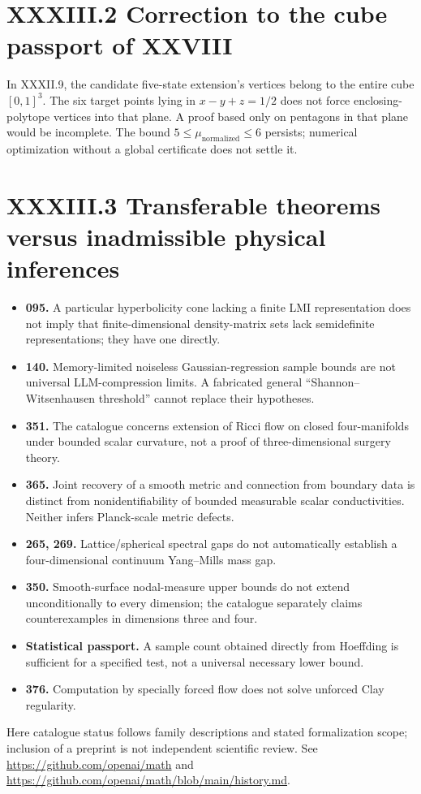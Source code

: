 \documentclass[11pt,a4paper,oneside]{book}
\begin{document}
\section*{XXXIII.2 Correction to the cube passport of XXVIII}
In XXXII.9, the candidate five-state extension's vertices belong to the entire cube $[0,1]^3$. The six target points lying in $x-y+z=1/2$ does not force enclosing-polytope vertices into that plane. A proof based only on pentagons in that plane would be incomplete. The bound $5\le\mu_{\mathrm{normalized}}\le6$ persists; numerical optimization without a global certificate does not settle it.
\section*{XXXIII.3 Transferable theorems versus inadmissible physical inferences}
\begin{itemize}
\item \textbf{095.} A particular hyperbolicity cone lacking a finite LMI representation does not imply that finite-dimensional density-matrix sets lack semidefinite representations; they have one directly.
\item \textbf{140.} Memory-limited noiseless Gaussian-regression sample bounds are not universal LLM-compression limits. A fabricated general ``Shannon--Witsenhausen threshold'' cannot replace their hypotheses.
\item \textbf{351.} The catalogue concerns extension of Ricci flow on closed four-manifolds under bounded scalar curvature, not a proof of three-dimensional surgery theory.
\item \textbf{365.} Joint recovery of a smooth metric and connection from boundary data is distinct from nonidentifiability of bounded measurable scalar conductivities. Neither infers Planck-scale metric defects.
\item \textbf{265, 269.} Lattice/spherical spectral gaps do not automatically establish a four-dimensional continuum Yang--Mills mass gap.
\item \textbf{350.} Smooth-surface nodal-measure upper bounds do not extend unconditionally to every dimension; the catalogue separately claims counterexamples in dimensions three and four.
\item \textbf{Statistical passport.} A sample count obtained directly from Hoeffding is sufficient for a specified test, not a universal necessary lower bound.
\item \textbf{376.} Computation by specially forced flow does not solve unforced Clay regularity.
\end{itemize}
Here catalogue status follows family descriptions and stated formalization scope; inclusion of a preprint is not independent scientific review. See \url{https://github.com/openai/math} and \url{https://github.com/openai/math/blob/main/history.md}.
\end{document}
